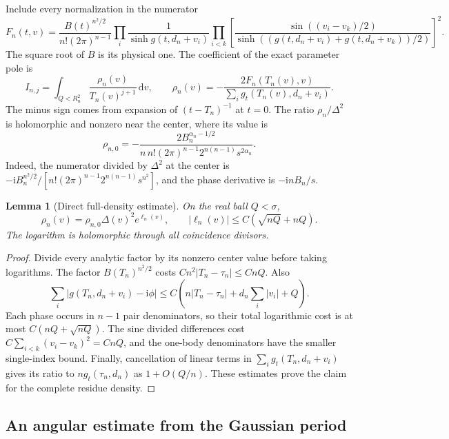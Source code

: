 \documentclass[11pt]{article}
\numberwithin{equation}{section}
\newtheorem{lemma}[theorem]{Lemma}
\theoremstyle{definition}
\newcommand{\dd}{\,\mathrm d}
\newcommand{\ii}{\mathrm i}
\begin{document}
Include every normalization in the numerator
\begin{equation}\label{eq:rc-numerator}
 F_n(t,v)=\frac{B(t)^{n^2/2}}{n!(2\pi)^{n-1}}
 \prod_i\frac1{\sinh g(t,d_n+v_i)}
 \prod_{i<k}\left[
 \frac{\sin((v_i-v_k)/2)}
 {\sinh((g(t,d_n+v_i)+g(t,d_n+v_k))/2)}\right]^2.
\end{equation}
The square root of $B$ is its physical one.  The coefficient of the
exact parameter pole is
\begin{equation}\label{eq:rc-residue}
 I_{n,j}=\int_{Q<R_n^2}\frac{\rho_n(v)}{T_n(v)^{j+1}}\dd v,
 \qquad
 \rho_n(v)=-\frac{2F_n(T_n(v),v)}
 {\sum_i g_t(T_n(v),d_n+v_i)}.
\end{equation}
The minus sign comes from expansion of $(t-T_n)^{-1}$ at $t=0$.
The ratio $\rho_n/\Delta^2$ is holomorphic and nonzero near the
center, where its value is
\begin{equation}\label{eq:rc-center-density}
 \rho_{n,0}=-\frac{2B_n^{\alpha_n-1/2}}
 {n\,n!(2\pi)^{n-1}2^{n(n-1)}s^{2\alpha_n}}.
\end{equation}
Indeed, the numerator divided by $\Delta^2$ at the center is
$-\ii B_n^{n^2/2}/[n!(2\pi)^{n-1}2^{n(n-1)}s^{n^2}]$,
and the phase derivative is $-\ii nB_n/s$.

\begin{lemma}[Direct full-density estimate]\label{lem:rc-density}
On the real ball $Q<\sigma$,
\begin{equation}\label{eq:rc-density-log}
 \rho_n(v)=\rho_{n,0}\Delta(v)^2e^{\ell_n(v)},\qquad
 |\ell_n(v)|\le C(\sqrt{nQ}+nQ).
\end{equation}
The logarithm is holomorphic through all coincidence divisors.
\end{lemma}
\begin{proof}
Divide every analytic factor by its nonzero center value before
taking logarithms.  The factor $B(T_n)^{n^2/2}$ costs
$Cn^2|T_n-\tau_n|\le CnQ$.  Also
\[
 \sum_i|g(T_n,d_n+v_i)-\ii\phi|
 \le C\left(n|T_n-\tau_n|+d_n\sum_i|v_i|+Q\right).
\]
Each phase occurs in $n-1$ pair denominators, so their total
logarithmic cost is at most $C(nQ+\sqrt{nQ})$.
The sine divided differences cost
$C\sum_{i<k}(v_i-v_k)^2=CnQ$, and the one-body denominators have
the smaller single-index bound.  Finally, cancellation of linear
terms in $\sum_i g_t(T_n,d_n+v_i)$ gives its ratio to
$ng_t(\tau_n,d_n)$ as $1+O(Q/n)$.  These estimates prove the claim
for the complete residue density.
\end{proof}

\subsection{An angular estimate from the Gaussian period}
\end{document}
